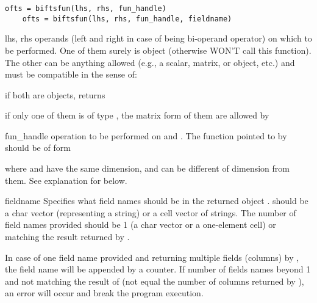 \usage
   \begin{lstlisting}[numbers=none]
    ofts = biftsfun(lhs, rhs, fun_handle)
    ofts = biftsfun(lhs, rhs, fun_handle, fieldname)
   \end{lstlisting}
\where
    \begin{argdesc}
    \item[lhs, rhs] operands (left and right in case of  being 
                 bi-operand operator) on which  to be performed.
                 One of them surely is \myfints{} object (otherwise \matlab{}
                 WON'T call this function). The other can be anything
                  allowed (e.g., a scalar, matrix, or \myfints{}
                 object, etc.)
                  and  must be compatible in the sense of:
                   \begin{itemize*}
                   \item if both are \myfints{} objects,  returns 
                   \item if only one of them is of type \myfints{}, the matrix
                     form of them are allowed by 
                   \end{itemize*}
    \item[fun\_handle] operation to be performed on  and .
                The function pointed to by  should be of form \par
                \hspace{1.0cm} \par
                where  and  have the same dimension,
                and  can be different of dimension from them.
                See explanation for  below.
    \item[fieldname] Specifies what field names should be in the returned
                 \myfints{} object .
                  should be a char vector (representing a string)
                 or a cell vector of strings. 
                 The number of field names provided should be 1 (a char
                 vector or a one-element cell) or matching the result
                 returned by . 

                 In case of one field name provided and returning 
                 multiple fields (columns) by , 
                 the field name will be appended by a counter.
                 If number of fields names beyond 1 and not matching the 
                 result of  (not equal the number of columns
                 returned by ), 
                 an error will occur and break the
                 program execution.


\end{argdesc}
